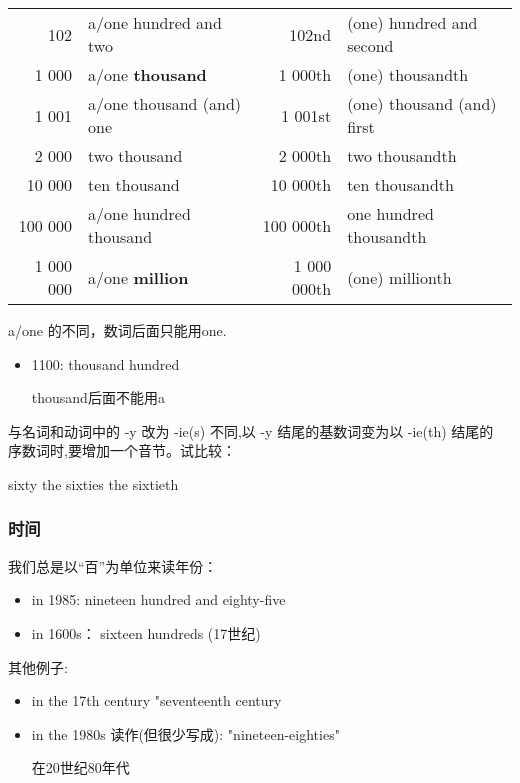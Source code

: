 \begin{table}[tp!]
\begin{tabular}[hp!]{rlrl}
    102       & a/one hundred and two    & 102nd       & (one) hundred and second   \\
    1 000     & a/one \textbf{thousand}        & 1 000th     & (one) thousandth           \\
    1 001     & a/one thousand (and) one & 1 001st     & (one) thousand (and) first \\
    2 000     & two thousand             & 2 000th     & two thousandth             \\
    10 000    & ten thousand             & 10 000th    & ten thousandth             \\
    100 000   & a/one hundred thousand   & 100 000th   & one hundred thousandth     \\
    1 000 000 & a/one \textbf{million}         & 1 000 000th & (one) millionth            \\
    \bottomrule
  \end{tabular}
\end{table}

a/one 的不同，数词后面只能用one.
\begin{itemize}
\item 1100:  thousand  hundred

  thousand后面不能用a
\end{itemize}

与名词和动词中的 -y 改为 -ie(s) 不同,以 -y 结尾的基数词变为以 -ie(th) 结尾的
序数词时,要增加一个音节。试比较：

sixty \qquad the sixties \qquad the sixtieth

\subsubsection{时间}

我们总是以“百”为单位来读年份：
\begin{itemize}
\item in 1985: nineteen hundred and eighty-five
\item in 1600s： sixteen hundreds (17世纪)
\end{itemize}
其他例子:
\begin{itemize}
\item in the 17th century "seventeenth century

\item in the 1980s 读作(但很少写成): "nineteen-eighties"

  在20世纪80年代
\end{itemize}

